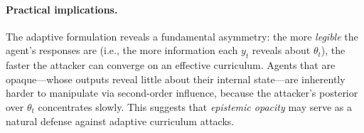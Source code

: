\paragraph{Practical implications.} The adaptive formulation reveals a fundamental asymmetry: the more \emph{legible} the agent's responses are (i.e., the more information each $y_t$ reveals about $\theta_t$), the faster the attacker can converge on an effective curriculum. Agents that are opaque---whose outputs reveal little about their internal state---are inherently harder to manipulate via second-order influence, because the attacker's posterior over $\theta_t$ concentrates slowly. This suggests that \emph{epistemic opacity} may serve as a natural defense against adaptive curriculum attacks.